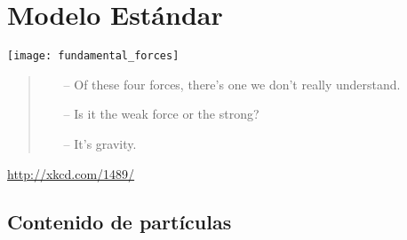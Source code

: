 \chapter{Modelo Estándar}
\label{cha:modelo-estandar} %

\texttt{[image: fundamental\_forces]}

\begin{quote}
  \begin{itemize}
  \item[--]  Of these four forces, there's one we don't really understand.
  \item[--] Is it the weak force or the strong?
  \item[--]It's gravity.
  \end{itemize}
\end{quote}
\url{http://xkcd.com/1489/}

\section{Contenido de partículas}

